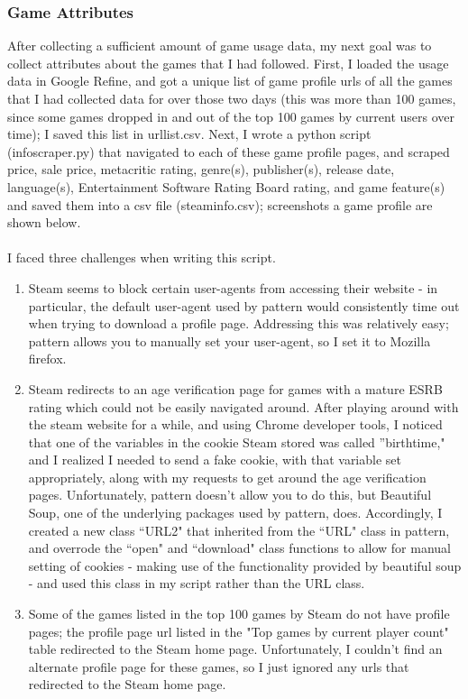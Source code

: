 \documentclass[pdftex,12pt,a4paper]{article}
\begin{document}
\subsubsection{Game Attributes}
After collecting a sufficient amount of game usage data, my next goal was to collect attributes about the games that I had followed. First, I loaded the usage data in Google Refine, and got a unique list of game profile urls of all the games that I had collected data for over those two days (this was more than 100 games, since some games dropped in and out of the top 100 games by current users over time); I saved this list in urllist.csv. Next, I wrote a python script (infoscraper.py) that navigated to each of these game profile pages, and scraped price, sale price, metacritic rating, genre(s), publisher(s), release date, language(s), Entertainment Software Rating Board rating, and game feature(s) and saved them into a csv file (steaminfo.csv); screenshots a game profile are shown below. \\ \\


I faced three challenges when writing this script. 
\begin{enumerate}
\item Steam seems to block certain user-agents from accessing their website - in particular, the default user-agent used by pattern would consistently time out when trying to download a profile page. Addressing this was relatively easy; pattern allows you to manually set your user-agent, so I set it to Mozilla firefox.
\item Steam redirects to an age verification page for games with a mature ESRB rating which could not be easily navigated around. After playing around with the steam website for a while, and using Chrome developer tools, I noticed that one of the variables in the cookie Steam stored was called ''birthtime," and I realized I needed to send a fake cookie, with that variable set appropriately, along with my requests to get around the age verification pages. Unfortunately, pattern doesn't allow you to do this, but Beautiful Soup, one of the underlying packages used by pattern, does. Accordingly, I created a new class ``URL2" that inherited from the ``URL" class in pattern, and overrode the ``open" and ``download" class functions to allow for manual setting of cookies - making use of the functionality provided by beautiful soup - and used this class in my script rather than the URL class.
\item Some of the games listed in the top 100 games by Steam do not have profile pages; the profile page url listed in the "Top games by current player count" table redirected to the Steam home page. Unfortunately, I couldn't find an alternate profile page for these games, so I just ignored any urls that redirected to the Steam home page.
\end{enumerate}
\end{document}
